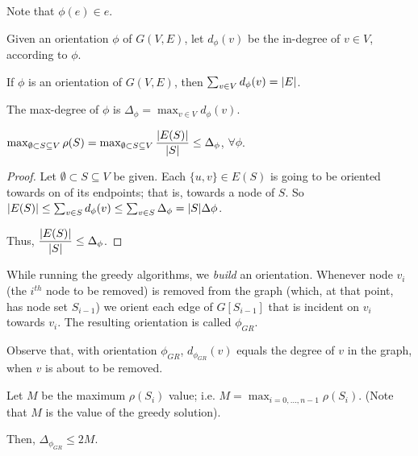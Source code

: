     Note that $\phi(e) \in e$.

    \begin{definition}
        Given an orientation $\phi$ of $G(V,E)$, let $d_\phi(v)$ be the in-degree of $v \in V$, according to $\phi$.
    \end{definition}

    \begin{observation}
        If $\phi$ is an orientation of $G(V,E)$, then $\sum_{v \in V} d_\phi(v) = \vert E \vert$.
    \end{observation}

    \begin{definition}
        The max-degree of $\phi$ is $\Delta_\phi = \max_{v \in V} d_\phi(v)$.
    \end{definition}

    \begin{lemma}
        $\max_{\emptyset \subset S \subseteq V} \rho(S) = \max_{\emptyset \subset S \subseteq V} \dfrac{\vert E(S) \vert}{\vert S \vert} \leq \Delta_\phi$, $\forall \phi$.
    \end{lemma}

    \begin{proof}
        Let $\emptyset \subset S \subseteq V$ be given.
        Each $\{u,v\} \in E(S)$ is going to be oriented towards on of its endpoints; that is, towards a node of $S$.
        So $\vert E(S) \vert \leq \sum_{v \in S} d_\phi(v) \leq \sum_{v \in S} \Delta_\phi = \vert S \vert \Delta\phi$.

        Thus, $\dfrac{\vert E(S) \vert}{\vert S \vert} \leq \Delta_\phi$.
    \end{proof}

    While running the greedy algorithms, we \textit{build} an orientation.
    Whenever node $v_i$ (the $i^{th}$ node to be removed) is removed from the graph (which, at that point, has node set $S_{i-1}$) we orient each edge of $G[S_{i-1}]$ that is incident on $v_i$ towards $v_i$.
    The resulting orientation is called $\phi_{GR}$.

    Observe that, with orientation $\phi_{GR}$, $d_{\phi_{GR}}(v)$ equals the degree of $v$ in the graph, when $v$ is about to be removed.

    \begin{lemma}
        Let $M$ be the maximum $\rho(S_i)$ value; i.e. $M = \max_{i = 0,\dots,n-1} \rho(S_i)$.
        (Note that $M$ is the value of the greedy solution).

        Then, $\Delta_{\phi_{GR}} \leq 2M$.
    \end{lemma}

